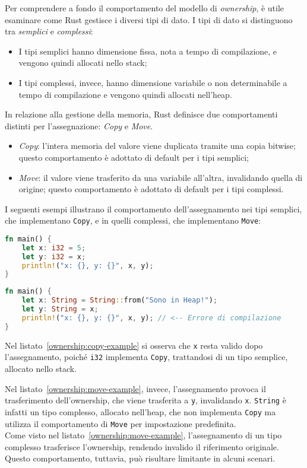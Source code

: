 Per comprendere a fondo il comportamento del modello di \textit{ownership}, è utile esaminare come Rust gestisce i diversi tipi di dato. I tipi di dato si distinguono tra \textit{semplici} e \textit{complessi}:
\begin{itemize}
    \item I tipi semplici hanno dimensione fissa, nota a tempo di compilazione, e vengono quindi allocati nello stack;
    \item I tipi complessi, invece, hanno dimensione variabile o non determinabile a tempo di compilazione e vengono quindi allocati nell'heap.
\end{itemize}
In relazione alla gestione della memoria, Rust definisce due comportamenti distinti per l'assegnazione: \textit{Copy} e \textit{Move}.
\begin{itemize}
    \item \textit{Copy}: l'intera memoria del valore viene duplicata tramite una copia bitwise; questo comportamento è adottato di default per i tipi semplici;
    \item \textit{Move}: il valore viene trasferito da una variabile all'altra, invalidando quella di origine; questo comportamento è adottato di default per i tipi complessi.
\end{itemize}

\noindent I seguenti esempi illustrano il comportamento dell'assegnamento nei tipi semplici, che implementano \texttt{Copy}, e in quelli complessi, che implementano \texttt{Move}:
\begin{lstlisting}[language=Rust, caption={Comportamento di Copy}, label={ownership:copy-example}]
fn main() {
    let x: i32 = 5;
    let y: i32 = x;
    println!("x: {}, y: {}", x, y);
}
\end{lstlisting}
\begin{lstlisting}[language=Rust, caption={Comportamento di Move}, label={ownership:move-example}]
fn main() {
    let x: String = String::from("Sono in Heap!");
    let y: String = x;
    println!("x: {}, y: {}", x, y); // <-- Errore di compilazione
}
\end{lstlisting}
Nel listato~\ref{ownership:copy-example} si osserva che \texttt{x} resta valido dopo l'assegnamento, poiché \texttt{i32} implementa \texttt{Copy}, trattandosi di un tipo semplice, allocato nello stack.

Nel listato~\ref{ownership:move-example}, invece, l'assegnamento provoca il trasferimento dell'ownership, che viene trasferita a \texttt{y}, invalidando \texttt{x}. \texttt{String} è infatti un tipo complesso, allocato nell'heap, che non implementa \texttt{Copy} ma utilizza il comportamento di \texttt{Move} per impostazione predefinita. \hfill
\vspace{10pt}\\
\noindent Come visto nel listato~\ref{ownership:move-example}, l'assegnamento di un tipo complesso trasferisce l'ownership, rendendo invalido il riferimento originale. Questo comportamento, tuttavia, può risultare limitante in alcuni scenari.

